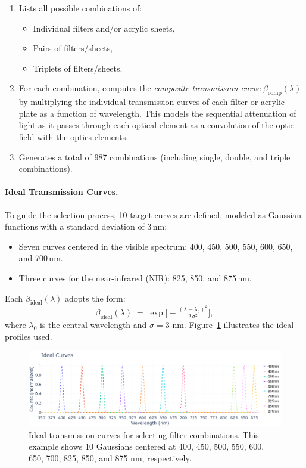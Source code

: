 \begin{enumerate}
    \item Lists all possible combinations of:
    \begin{itemize}
        \item Individual filters and/or acrylic sheets,
        \item Pairs of filters/sheets,
        \item Triplets of filters/sheets.
    \end{itemize}
    \item For each combination, computes the \emph{composite transmission curve} \(\beta_{\text{comp}}(\lambda)\) by multiplying the individual transmission curves of each filter or acrylic plate as a function of wavelength. This models the sequential attenuation of light as it passes through each optical element as a convolution of the optic field with the optics elements.
    \item Generates a total of 987 combinations (including single, double, and triple combinations).
\end{enumerate}

\paragraph{Ideal Transmission Curves.}
To guide the selection process, 10 target curves are defined, modeled as Gaussian functions with a standard deviation of 3\,nm:

\begin{itemize}
    \item Seven curves centered in the visible spectrum: 400, 450, 500, 550, 600, 650, and 700\,nm.
    \item Three curves for the near-infrared (NIR): 825, 850, and 875\,nm.
\end{itemize}

Each \(\beta_{\text{ideal}}(\lambda)\) adopts the form:
\[
\beta_{\text{ideal}}(\lambda) \;=\; \exp\!\Big[-\tfrac{(\lambda - \lambda_0)^2}{2 \,\sigma^2}\Big],
\]
where \(\lambda_0\) is the central wavelength and \(\sigma=3\) nm.  
Figure~\ref{fig:curvas_ideales} illustrates the ideal profiles used.

\begin{figure}[H]
    \centering
    \includegraphics[trim=0mm 0mm 0mm 25mm, clip, width=1\textwidth]{Figures/C3/ideal_spec.png}
    \caption{Ideal transmission curves for selecting filter combinations. This example shows 10 Gaussians centered at 400, 450, 500, 550, 600, 650, 700, 825, 850, and 875 nm, respectively.}
    \label{fig:curvas_ideales}
\end{figure}

